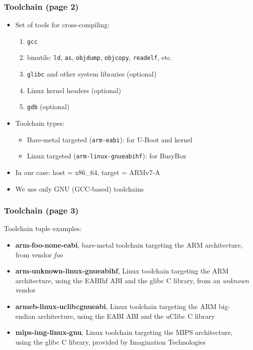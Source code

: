 \documentclass[aspectratio=169]{beamer}
\begin{document}
\begin{frame}
  \frametitle{Toolchain (page 2)}
  \begin{itemize}
    \item Set of tools for cross-compiling:
    \begin{enumerate}
      \item \texttt{gcc}
      \item binutils: \texttt{ld}, \texttt{as}, \texttt{objdump},
            \texttt{objcopy}, \texttt{readelf}, etc.
      \item \texttt{glibc} and other system libraries (\alert{optional})
      \item Linux kernel headers (\alert{optional})
      \item \texttt{gdb} (\alert{optional})
    \end{enumerate}
    \pause
    \item Toolchain types:
    \begin{itemize}
      \item Bare-metal targeted (\texttt{arm-eabi}): for U-Boot and kernel
      \item Linux targeted (\texttt{arm-linux-gnueabihf}): for BusyBox
    \end{itemize}
    \item In our case: host = x86\_64, target = ARMv7-A
    \item We use only GNU (GCC-based) toolchains
  \end{itemize}
\end{frame}

\begin{frame}
  \frametitle{Toolchain (page 3)}
  Toolchain tuple examples:
  \begin{itemize}
  \item \textbf{arm-foo-none-eabi}, bare-metal toolchain targeting the ARM
        architecture, from vendor \textit{foo}
  \item \textbf{arm-unknown-linux-gnueabihf}, Linux toolchain targeting the ARM
        architecture, using the EABIhf ABI and the glibc C library, from an
        \textit{unknown} vendor
  \item \textbf{armeb-linux-uclibcgnueabi}, Linux toolchain targeting the ARM
        big-endian architecture, using the EABI ABI and the uClibc C library
  \item \textbf{mips-img-linux-gnu}, Linux toolchain targeting the MIPS
        architecture, using the glibc C library, provided by Imagination
        Technologies
  \end{itemize}
\end{frame}
\end{document}
